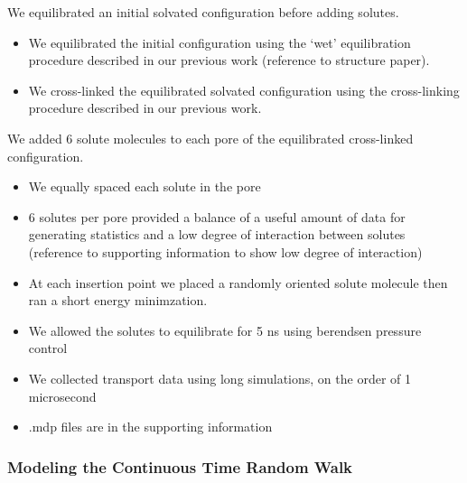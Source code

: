 \documentclass{article}
\begin{document}

  We equilibrated an initial solvated configuration before adding solutes.
  \begin{itemize}
	\item We equilibrated the initial configuration using the `wet'
	equilibration procedure described in our previous work (reference to structure
	paper).
	\item We cross-linked the equilibrated solvated configuration using the
	cross-linking procedure described in our previous work. 
  \end{itemize}

  We added 6 solute molecules to each pore of the equilibrated cross-linked
  configuration.
  \begin{itemize}
	\item We equally spaced each solute in the pore
	\item 6 solutes per pore provided a balance of a useful amount of data
	for generating statistics and a low degree of interaction between solutes (reference
	to supporting information to show low degree of interaction)
	\item At each insertion point we placed a randomly oriented solute molecule
	then ran a short energy minimzation.
	\item We allowed the solutes to equilibrate for 5 ns using berendsen 
	pressure control
	\item We collected transport data using long simulations, on the order of
	1 microsecond
	\item .mdp files are in the supporting information %
  \end{itemize}
  
  \subsubsection*{Modeling the Continuous Time Random Walk}\label{method:CTRW}
\end{document}

